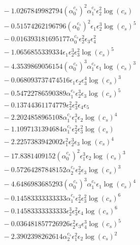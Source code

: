 \documentclass[10pt]{article}
\begin{document}
\begin{align*}
&{}  - 1.0267849982794 \left(\alpha_{0}^{c_s}\right)^{2} \alpha_{1}^{c_s} \epsilon_{2}^{2} \log{\left(c_{s} \right)} \\
&{}  - 0.51574262196796 \left(\alpha_{0}^{c_s}\right)^{2} \epsilon_{1} \epsilon_{2}^{3} \log{\left(c_{s} \right)}^{5} \\
&{}  - 0.016393181695177 \alpha_{0}^{c_s} \epsilon_{2}^{2} \epsilon_{3} \epsilon_{4}^{2} \\
&{}  - 1.0656855339334 \epsilon_{1} \epsilon_{2}^{3} \epsilon_{3}^{2} \log{\left(c_{s} \right)}^{5} \\
&{}  - 4.3539869056154 \left(\alpha_{0}^{c_s}\right)^{3} \alpha_{1}^{c_s} \epsilon_{1} \log{\left(c_{s} \right)}^{3} \\
&{}  - 0.068093737474516 \epsilon_{1} \epsilon_{2} \epsilon_{3}^{4} \log{\left(c_{s} \right)}^{3} \\
&{}  - 0.54722786590389 \alpha_{1}^{c_s} \epsilon_{2}^{3} \epsilon_{3} \log{\left(c_{s} \right)}^{5} \\
&{}  - 0.13744361174779 \epsilon_{2}^{2} \epsilon_{3}^{2} \epsilon_{4} \epsilon_{5} \\
&{}  - 2.2024858965108 \alpha_{1}^{c_s} \epsilon_{1}^{3} \epsilon_{2} \log{\left(c_{s} \right)}^{4} \\
&{}  - 1.1097131394684 \alpha_{1}^{c_s} \epsilon_{2}^{2} \epsilon_{3}^{2} \log{\left(c_{s} \right)} \\
&{}  - 2.2257383942002 \epsilon_{1}^{2} \epsilon_{2}^{3} \epsilon_{3} \log{\left(c_{s} \right)}^{4} \\
&{}  - 17.8381409152 \left(\alpha_{0}^{c_s}\right)^{2} \epsilon_{1}^{3} \epsilon_{2} \log{\left(c_{s} \right)}^{3} \\
&{}  - 0.57264287848152 \alpha_{2}^{c_s} \epsilon_{2}^{2} \epsilon_{3} \log{\left(c_{s} \right)}^{3} \\
&{}  - 4.6486983685293 \left(\alpha_{0}^{c_s}\right)^{3} \alpha_{1}^{c_s} \epsilon_{1} \log{\left(c_{s} \right)}^{4} \\
&{}  - 0.14583333333333 \alpha_{1}^{c_s} \epsilon_{2}^{2} \epsilon_{3}^{2} \log{\left(c_{s} \right)}^{6} \\
&{}  - 0.14583333333333 \epsilon_{2}^{3} \epsilon_{3}^{2} \epsilon_{4} \log{\left(c_{s} \right)}^{6} \\
&{}  - 0.036481857726926 \epsilon_{2}^{2} \epsilon_{3} \epsilon_{4}^{3} \log{\left(c_{s} \right)}^{5} \\
&{}  - 2.3902398262614 \alpha_{2}^{c_s} \epsilon_{1}^{2} \epsilon_{2} \log{\left(c_{s} \right)}^{2} \\

\end{align*}
\end{document}
